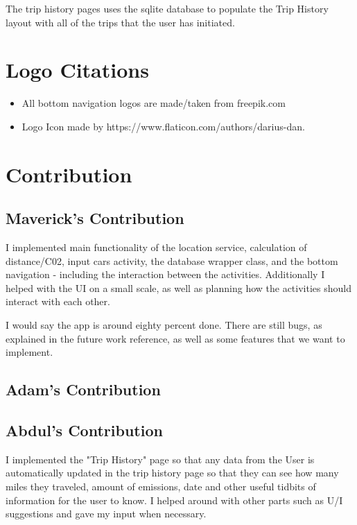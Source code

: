 \documentclass[twoside,twocolumn]{article}
\begin{document}
The trip history pages uses the sqlite database to populate the Trip History layout with all of the trips that the user has initiated.


\section{Logo Citations}
\begin{itemize}
\item All bottom navigation logos are made/taken from freepik.com
\item Logo Icon made by https://www.flaticon.com/authors/darius-dan.
\end{itemize}

\section{Contribution}

\subsection{Maverick's Contribution}
I implemented main functionality of the location service, calculation of distance/C02, input cars activity, the database wrapper class, and the bottom navigation - including the interaction between the activities. Additionally I helped with the UI on a small scale, as well as planning how the activities should interact with each other.

I would say the app is around eighty percent done. There are still bugs, as explained in the future work reference, as well as some features that we want to implement. 

\subsection{Adam's Contribution}


\subsection{Abdul's Contribution}
I implemented the "Trip History" page so that any data from the User is automatically updated in the trip history page so that they can see how many miles they traveled, amount of emissions, date and other useful tidbits of information for the user to know. I helped around with other parts such as U/I suggestions and gave my input when necessary.
\end{document}
